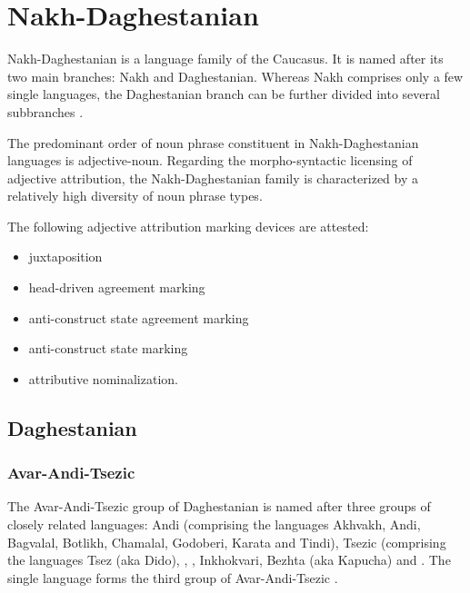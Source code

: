 \section{Nakh-Daghestanian}
Nakh-Daghestanian is a language family of the Caucasus. It is named after its two main branches: Nakh and Daghestanian. Whereas Nakh comprises only a few single languages, the Daghestanian branch can be further divided into several subbranches \cite[220, 233]{salminen2007}.

The predominant order of noun phrase constituent in Nakh-Daghestanian languages is adjective-noun. Regarding the morpho-syntactic licensing of adjective attribution, the Nakh-Daghestanian family is characterized by a relatively high diversity of noun phrase types.

The following adjective attribution marking devices are attested:
\begin{itemize}
\item juxtaposition
\item head\hyp{}driven agreement marking
\item anti\hyp{}construct state agreement marking
\item anti\hyp{}construct state marking
\item attributive nominalization.
\end{itemize}

\subsection{Daghestanian}
\subsubsection{Avar-Andi-Tsezic}
The Avar-Andi-Tsezic group of Daghestanian is named after three groups of closely related languages: Andi (comprising the languages Akhvakh, Andi, Bagvalal, Botlikh, Chamalal, Godoberi, Karata and Tindi), Tsezic (comprising the languages Tsez (aka Dido), , , Inkhokvari, Bezhta (aka Kapucha) and . The single language  forms the third group of Avar-Andi-Tsezic \citep[220, 233]{salminen2007}.

